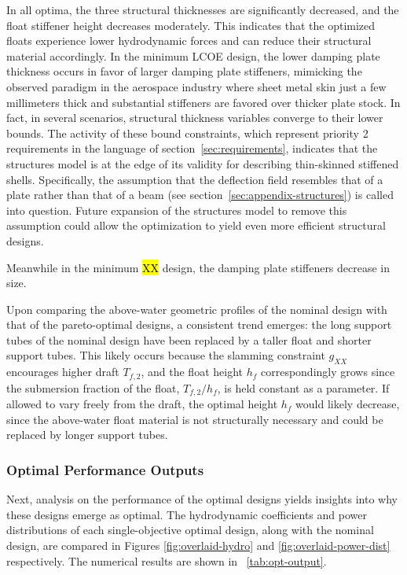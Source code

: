 In all optima, the three structural thicknesses are significantly decreased, and the float stiffener height decreases moderately.
This indicates that the optimized floats experience lower hydrodynamic forces and can reduce their structural material accordingly.
In the minimum LCOE design, the lower damping plate thickness occurs in favor of larger damping plate stiffeners, mimicking the observed paradigm in the aerospace industry where sheet metal skin just a few millimeters thick and substantial stiffeners are favored over thicker plate stock.
In fact, in several scenarios, structural thickness variables converge to their lower bounds.
The activity of these bound constraints, which represent priority 2 requirements in the language of section~\ref{sec:requirements}, indicates that the structures model is at the edge of its validity for describing thin-skinned stiffened shells.
Specifically, the assumption that the deflection field resembles that of a plate rather than that of a beam (see section~\ref{sec:appendix-structures}) is called into question.
Future expansion of the structures model to remove this assumption could allow the optimization to yield even more efficient structural designs.

Meanwhile in the minimum \hl{XX} design, the damping plate stiffeners decrease in size. 


Upon comparing the above-water geometric profiles of the nominal design with that of the pareto-optimal designs, a consistent trend emerges: the long support tubes of the nominal design have been replaced by a taller float and shorter support tubes.
This likely occurs because the slamming constraint $g_{XX}$ encourages higher draft $T_{f,2}$, and the float height $h_f$ correspondingly grows since the submersion fraction of the float, $T_{f,2}/h_f$, is held constant as a parameter.
If allowed to vary freely from the draft, the optimal height $h_f$ would likely decrease, since the above-water float material is not structurally necessary and could be replaced by longer support tubes.

\subsubsection{Optimal Performance Outputs}
Next, analysis on the performance of the optimal designs yields insights into why these designs emerge as optimal.
The hydrodynamic coefficients and power distributions of each single-objective optimal design, along with the nominal design, are compared in Figures \ref{fig:overlaid-hydro} and \ref{fig:overlaid-power-dist} respectively.
The numerical results are shown in \tablename~\ref{tab:opt-output}.

